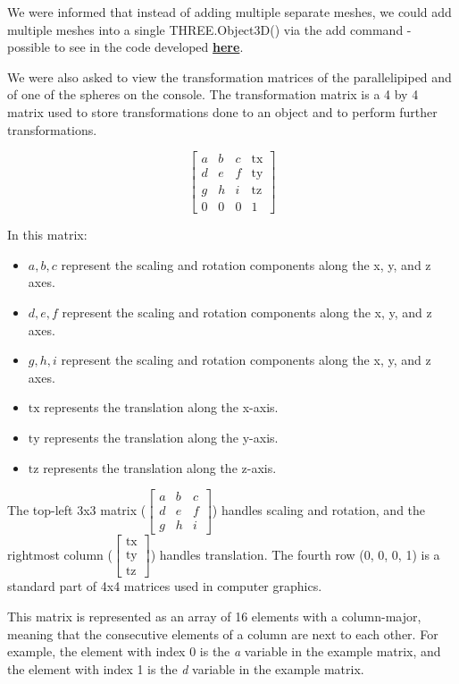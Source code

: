 \documentclass[12pt]{article}
\begin{document}
We were informed that instead of adding multiple separate meshes, we could add multiple meshes into a single THREE.Object3D() via the add command - possible to see in the code developed \textbf{\href{https://github.com/goncalo-machado/VI}{here}}.

We were also asked to view the transformation matrices of the parallelipiped and of one of the spheres on the console. The transformation matrix is a 4 by 4 matrix used to store transformations done to an object and to perform further transformations.

\[
\begin{bmatrix}
a & b & c & \text{{tx}} \\
d & e & f & \text{{ty}} \\
g & h & i & \text{{tz}} \\
0 & 0 & 0 & 1
\end{bmatrix}
\]

In this matrix:
\begin{itemize}
    \item \( a, b, c \) represent the scaling and rotation components along the x, y, and z axes.
    \item \( d, e, f \) represent the scaling and rotation components along the x, y, and z axes.
    \item \( g, h, i \) represent the scaling and rotation components along the x, y, and z axes.
    \item \( \text{{tx}} \) represents the translation along the x-axis.
    \item \( \text{{ty}} \) represents the translation along the y-axis.
    \item \( \text{{tz}} \) represents the translation along the z-axis.
\end{itemize}

The top-left 3x3 matrix (\( \begin{bmatrix} a & b & c \\ d & e & f \\ g & h & i \end{bmatrix} \)) handles scaling and rotation, and the rightmost column (\( \begin{bmatrix} \text{{tx}} \\ \text{{ty}} \\ \text{{tz}} \end{bmatrix} \)) handles translation. The fourth row (0, 0, 0, 1) is a standard part of 4x4 matrices used in computer graphics.

This matrix is represented as an array of 16 elements with a column-major, meaning that the consecutive elements of a column are next to each other. For example, the element with index 0 is the \textit{a} variable in the example matrix, and the element with index 1 is the \textit{d} variable in the example matrix.
\end{document}

